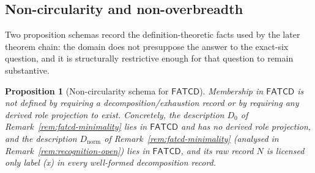 \documentclass[11pt]{article}
\newtheorem{proposition}[theorem]{Proposition}
\theoremstyle{definition}
\newcommand{\FATCD}{\ensuremath{\mathsf{FATCD}}}
\begin{document}
\subsection{Non-circularity and non-overbreadth}\label{subsec:non-circularity-non-overbreadth}

Two proposition schemas record the definition-theoretic facts used by
the later theorem chain: the domain does not presuppose the answer to
the exact-six question, and it is structurally restrictive enough
for that question to remain substantive.

\begin{proposition}[Non-circularity schema for \FATCD{}]\label{prop:non-circularity}
Membership in \FATCD{} is not defined by requiring a
decomposition/exhaustion record or by requiring any derived role
projection to exist. Concretely, the description \(D_0\) of
Remark~\ref{rem:fatcd-minimality} lies in \FATCD{} and has no derived role
projection, and the description \(D_{\mathrm{norm}}\) of
Remark~\ref{rem:fatcd-minimality} (analysed in
Remark~\ref{rem:recognition-open}) lies in \FATCD{}, and its raw record \(N\)
is licensed only label (x) in every well-formed decomposition record.
\end{proposition}
\end{document}
